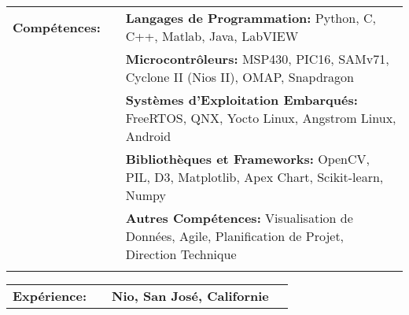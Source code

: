 \documentclass{minimal}
\begin{document}

\begin{center}
\fontsize{14}{12.8}\selectfont
\name\\
\fontsize{10}{12}\selectfont
\address\\
\phone\\
\email\\
\github\\
\end{center}
\vspace{0.5cm}

\begin{tabular}{ p{1.5cm} p{1cm} p{16cm} }
\textbf{Compétences:} & & \textbf{Langages de Programmation:} Python, C, C++, Matlab, Java, LabVIEW\\
& & \textbf{Microcontrôleurs:} MSP430, PIC16, SAMv71, Cyclone II (Nios II), OMAP, Snapdragon\\
& & \textbf{Systèmes d'Exploitation Embarqués:} FreeRTOS, QNX, Yocto Linux, Angstrom Linux, Android\\
& & \textbf{Bibliothèques et Frameworks:} OpenCV, PIL, D3, Matplotlib, Apex Chart, Scikit-learn, Numpy\\
& & \textbf{Autres Compétences:} Visualisation de Données, Agile, Planification de Projet, Direction Technique\\
& & \\
\end{tabular}

\begin{tabular}{ p{1.5cm} p{1cm} p{16cm} >{\raggedleft\arraybackslash}p{3cm} }
\textbf{Expérience:} & & \textbf{Nio, San José, Californie} & \\
\end{tabular}
\end{document}
